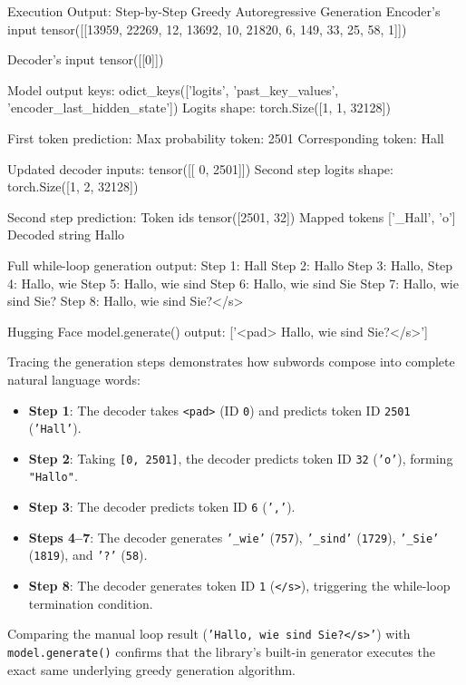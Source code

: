 \documentclass[11pt,a4paper]{article}
\begin{document}
\begin{macterminal}{Execution Output: Step-by-Step Greedy Autoregressive Generation}
Encoder's input
tensor([[13959, 22269,    12, 13692,    10, 21820,     6,   149,    33,    25,
            58,     1]])

Decoder's input
tensor([[0]])

Model output keys: odict_keys(['logits', 'past_key_values', 'encoder_last_hidden_state'])
Logits shape: torch.Size([1, 1, 32128])

First token prediction: Max probability token: 2501
Corresponding token: Hall

Updated decoder inputs: tensor([[   0, 2501]])
Second step logits shape: torch.Size([1, 2, 32128])

Second step prediction: Token ids tensor([2501,   32])
Mapped tokens ['_Hall', 'o']
Decoded string Hallo

Full while-loop generation output:
Step 1: Hall
Step 2: Hallo
Step 3: Hallo,
Step 4: Hallo, wie
Step 5: Hallo, wie sind
Step 6: Hallo, wie sind Sie
Step 7: Hallo, wie sind Sie?
Step 8: Hallo, wie sind Sie?</s>

Hugging Face model.generate() output:
['<pad> Hallo, wie sind Sie?</s>']
\end{macterminal}

Tracing the generation steps demonstrates how subwords compose into complete natural language words:
\begin{itemize}
    \item \textbf{Step 1}: The decoder takes \texttt{<pad>} (ID \texttt{0}) and predicts token ID \texttt{2501} (\texttt{'Hall'}).
    \item \textbf{Step 2}: Taking \texttt{[0, 2501]}, the decoder predicts token ID \texttt{32} (\texttt{'o'}), forming \texttt{"Hallo"}.
    \item \textbf{Step 3}: The decoder predicts token ID \texttt{6} (\texttt{','}).
    \item \textbf{Steps 4--7}: The decoder generates \texttt{'\_wie'} (\texttt{757}), \texttt{'\_sind'} (\texttt{1729}), \texttt{'\_Sie'} (\texttt{1819}), and \texttt{'?'} (\texttt{58}).
    \item \textbf{Step 8}: The decoder generates token ID \texttt{1} (\texttt{</s>}), triggering the while-loop termination condition.
\end{itemize}
Comparing the manual loop result (\texttt{'Hallo, wie sind Sie?</s>'}) with \texttt{model.generate()} confirms that the library's built-in generator executes the exact same underlying greedy generation algorithm.
\end{document}
